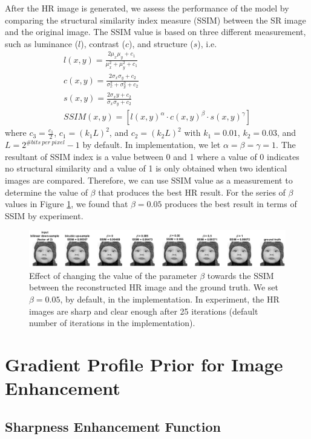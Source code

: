 \documentclass[a4paper,11pt]{article}
\begin{document}
After the HR image is generated, we assess the performance of the model by comparing the structural similarity index measure (SSIM) between the SR image and the original image. The SSIM value is based on three different measurement, such as luminance ($l$), contrast ($c$), and structure ($s$), i.e.
\begin{gather*}
	l(x,y) = \frac{2 \mu_x \mu_y + c_1}{\mu_x^2 + \mu_y^2 + c_1}\\
	c(x,y) = \frac{2 \sigma_x \sigma_y + c_2}{\sigma_x^2 + \sigma_y^2 + c_2}\\
	s(x,y) = \frac{2 \sigma_xy + c_2}{\sigma_x \sigma_y + c_2}\\
	SSIM(x,y) = [l(x,y)^\alpha \cdot c(x,y)^\beta \cdot s(x,y)^\gamma]
\end{gather*}
where $c_3 = \frac{c_1}{2}$, $c_1=(k_1L)^2$, and $c_2=(k_2L)^2$ with $k_1=0.01$, $k_2=0.03$, and $L=2^{\#bits\ per\ pixel}-1$ by default. In implementation, we let $\alpha = \beta = \gamma = 1$. The resultant of SSIM index is a value between 0 and 1 where a value of 0 indicates no structural similarity and a value of 1 is only obtained when two identical images are compared. Therefore, we can use SSIM value as a measurement to determine the value of $\beta$ that produces the best HR result. For the series of $\beta$ values in Figure \ref{fig:beta}, we found that $\beta = 0.05$ produces the best result in terms of SSIM by experiment.

\begin{figure}[H]
	\centering
	\includegraphics[width=1\textwidth]{beta.png}
	\caption{Effect of changing the value of the parameter $\beta$ towards the SSIM between the reconstructed HR image and the ground truth. We set $\beta = 0.05$, by default, in the implementation. In experiment, the HR images are sharp and clear enough after 25 iterations (default number of iterations in the implementation).}
	\label{fig:beta}
\end{figure}

\section{Gradient Profile Prior for Image Enhancement}
\label{sec:Gradient Profile Prior for Image Enhancement}

\subsection{Sharpness Enhancement Function}
\end{document}
